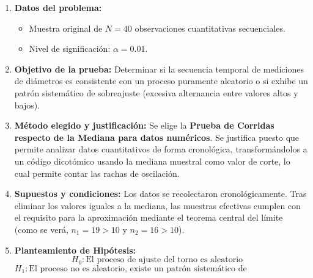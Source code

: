 \documentclass[11pt,a4paper]{article}
\begin{document}
\begin{enumerate}
    \item \textbf{Datos del problema:}
    \begin{itemize}
        \item Muestra original de $N = 40$ observaciones cuantitativas secuenciales.
        \item Nivel de significación: $\alpha = 0.01$.
    \end{itemize}

    \item \textbf{Objetivo de la prueba:}
    Determinar si la secuencia temporal de mediciones de diámetros es consistente con un proceso puramente aleatorio o si exhibe un patrón sistemático de sobreajuste (excesiva alternancia entre valores altos y bajos).

    \item \textbf{Método elegido y justificación:}
    Se elige la \textbf{Prueba de Corridas respecto de la Mediana para datos numéricos}. Se justifica puesto que permite analizar datos cuantitativos de forma cronológica, transformándolos a un código dicotómico usando la mediana muestral como valor de corte, lo cual permite contar las rachas de oscilación.

    \item \textbf{Supuestos y condiciones:}
    Los datos se recolectaron cronológicamente. Tras eliminar los valores iguales a la mediana, las muestras efectivas cumplen con el requisito para la aproximación mediante el teorema central del límite (como se verá, $n_1 = 19 > 10$ y $n_2 = 16 > 10$).

    \item \textbf{Planteamiento de Hipótesis:}
    \[ H_0: \text{El proceso de ajuste del torno es aleatorio} \quad \]
    \[ H_1: \text{El proceso no es aleatorio, existe un patrón sistemático de repetición/alternancia} \quad \]


\end{enumerate}
\end{document}
